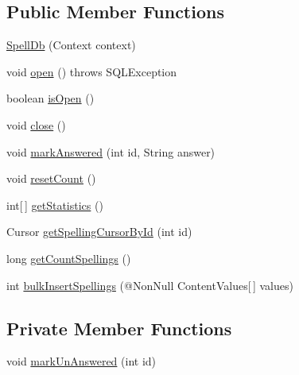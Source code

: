 \subsection*{Public Member Functions}
\begin{DoxyCompactItemize}
\item 
\hyperlink{classorg_1_1buildmlearn_1_1learnspellings_1_1data_1_1SpellDb_a5cb41d2334947b65ba91753e5f46ebe4}{Spell\+Db} (Context context)
\item 
void \hyperlink{classorg_1_1buildmlearn_1_1learnspellings_1_1data_1_1SpellDb_a6bad90f8c2c38a64ca081af2aa4de0a6}{open} ()  throws S\+Q\+L\+Exception 
\item 
boolean \hyperlink{classorg_1_1buildmlearn_1_1learnspellings_1_1data_1_1SpellDb_a871756b90907eb4f8c2991f6ac554872}{is\+Open} ()
\item 
void \hyperlink{classorg_1_1buildmlearn_1_1learnspellings_1_1data_1_1SpellDb_ac5836ac7bae306f4dffdab8fb9626c40}{close} ()
\item 
void \hyperlink{classorg_1_1buildmlearn_1_1learnspellings_1_1data_1_1SpellDb_a6c58a46f144f8e5495e5d3175ce9ea1d}{mark\+Answered} (int id, String answer)
\item 
void \hyperlink{classorg_1_1buildmlearn_1_1learnspellings_1_1data_1_1SpellDb_ae2e11f1168288200599d596923fa5962}{reset\+Count} ()
\item 
int\mbox{[}$\,$\mbox{]} \hyperlink{classorg_1_1buildmlearn_1_1learnspellings_1_1data_1_1SpellDb_aca7a3e8f424e8e5b55bf8171f90af732}{get\+Statistics} ()
\item 
Cursor \hyperlink{classorg_1_1buildmlearn_1_1learnspellings_1_1data_1_1SpellDb_ab994e7fd7efaebb23e6a6e98afff2f79}{get\+Spelling\+Cursor\+By\+Id} (int id)
\item 
long \hyperlink{classorg_1_1buildmlearn_1_1learnspellings_1_1data_1_1SpellDb_a8c851c335b3770fc3b73d853d92c970f}{get\+Count\+Spellings} ()
\item 
int \hyperlink{classorg_1_1buildmlearn_1_1learnspellings_1_1data_1_1SpellDb_a73be332ef8045d02fd41de6f00c20708}{bulk\+Insert\+Spellings} (@Non\+Null Content\+Values\mbox{[}$\,$\mbox{]} values)
\end{DoxyCompactItemize}
\subsection*{Private Member Functions}
\begin{DoxyCompactItemize}
\item 
void \hyperlink{classorg_1_1buildmlearn_1_1learnspellings_1_1data_1_1SpellDb_a1d09e58eb1051d5c08d6445ccf3acfe1}{mark\+Un\+Answered} (int id)
\end{DoxyCompactItemize}
